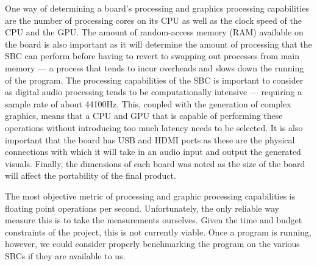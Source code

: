\documentclass[../main_report2.tex]{subfiles}
\begin{document}
One way of determining a board's processing and graphics processing capabilities are the number of processing cores on its CPU as well as the clock speed of the CPU and the GPU. The amount of random-access memory (RAM) available on the board is also important as it will determine the amount of processing that the SBC can perform before having to revert to swapping out processes from main memory --- a process that tends to incur overheads and slows down the running of the program. The processing capabilities of the SBC is important to consider as digital audio processing tends to be computationally intensive --- requiring a sample rate of about 44100Hz. This, coupled with the generation of complex graphics, means that a CPU and GPU that is capable of performing these operations without introducing too much latency needs to be selected. It is also important that the board has USB and HDMI ports as these are the physical connections with which it will take in an audio input and output the generated visuals. Finally, the dimensions of each board was noted as the size of the board will affect the portability of the final product. \par

The most objective metric of processing and graphic processing capabilities is floating point operations per second. Unfortunately, the only reliable way measure this is to take the measurements ourselves. Given the time and budget constraints of the project, this is not currently viable. Once a program is running, however, we could consider properly benchmarking the program on the various SBCs if they are available to us.
\end{document}
